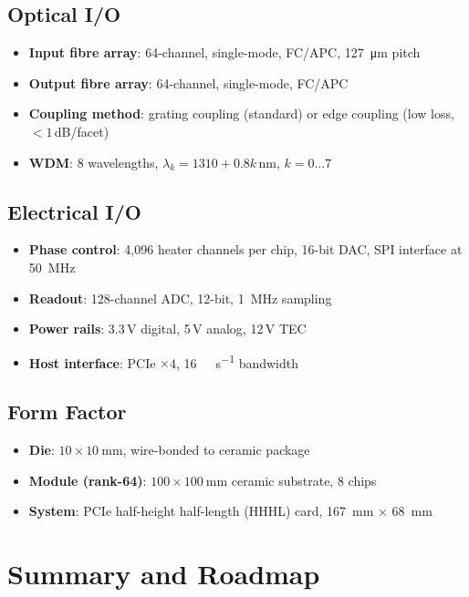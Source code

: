 \documentclass[12pt, a4paper]{article}
\begin{document}
\subsection{Optical I/O}
\begin{itemize}
  \item \textbf{Input fibre array}: 64-channel, single-mode, FC/APC, \SI{127}{\micro\metre} pitch
  \item \textbf{Output fibre array}: 64-channel, single-mode, FC/APC
  \item \textbf{Coupling method}: grating coupling (standard) or edge coupling (low loss, $< 1$\,dB/facet)
  \item \textbf{WDM}: 8 wavelengths, $\lambda_k = 1310 + 0.8k\,\mathrm{nm}$, $k=0\ldots7$
\end{itemize}

\subsection{Electrical I/O}
\begin{itemize}
  \item \textbf{Phase control}: 4,096 heater channels per chip, 16-bit DAC, SPI interface at \SI{50}{\mega\hertz}
  \item \textbf{Readout}: 128-channel ADC, 12-bit, \SI{1}{\mega\hertz} sampling
  \item \textbf{Power rails}: 3.3\,V digital, 5\,V analog, 12\,V TEC
  \item \textbf{Host interface}: PCIe $\times$4, \SI{16}{\giga\byte\per\second} bandwidth
\end{itemize}

\subsection{Form Factor}
\begin{itemize}
  \item \textbf{Die}: $10\times\SI{10}{\milli\metre}$, wire-bonded to ceramic package
  \item \textbf{Module (rank-64)}: $100\times\SI{100}{\milli\metre}$ ceramic substrate, 8 chips
  \item \textbf{System}: PCIe half-height half-length (HHHL) card, \SI{167}{\milli\metre} $\times$ \SI{68}{\milli\metre}
\end{itemize}

\section{Summary and Roadmap}
\label{sec:summary}
\end{document}
